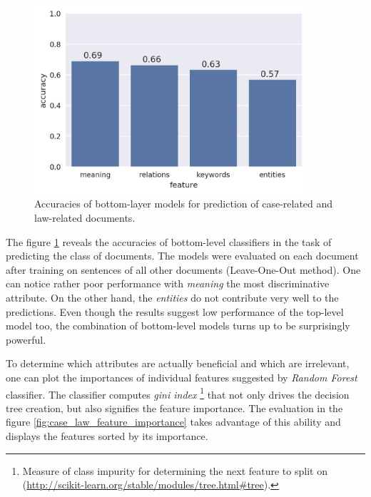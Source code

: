 \documentclass[
  digital, %
  notable,   %
  nolof,     %
  nolot,     %
  draft
]{fithesis3}
\begin{document}
\begin{figure}[h]
\caption{Accuracies of bottom-layer models for prediction of case-related and law-related documents.}
\label{fig:Case-Law_accuracies}
\includegraphics[width=0.9\textwidth]{img/Case-Law_accuracies}
\end{figure}

The figure \ref{fig:Case-Law_accuracies} reveals the accuracies of bottom-level classifiers in the task of predicting the class of documents.
The models were evaluated on each document after training on sentences of all other documents (Leave-One-Out method).
One can notice rather poor performance with \textit{meaning} the most discriminative attribute.
On the other hand, the \textit{entities} do not contribute very well to the predictions.
Even though the results suggest low performance of the top-level model too, the combination of bottom-level models turns up to be surprisingly powerful.

To determine which attributes are actually beneficial and which are irrelevant, one can plot the importances of individual features suggested by \textit{Random Forest} classifier.
The classifier computes \textit{gini index} \footnote{Measure of class impurity for determining the next feature to split on \\(\url{http://scikit-learn.org/stable/modules/tree.html\#tree}).} that not only drives the decision tree creation, but also signifies the feature importance.
The evaluation in the figure \ref{fig:case_law_feature_importance} takes advantage of this ability and displays the features sorted by its importance.
\end{document}
